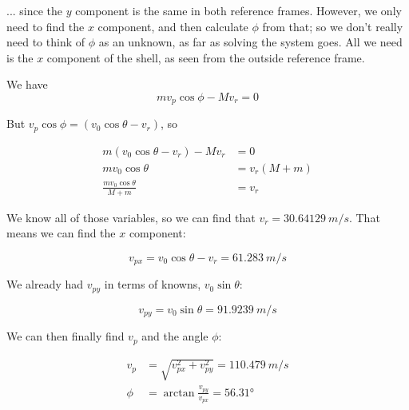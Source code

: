 \documentclass[8.01x]{subfiles}
\begin{document}
... since the $y$ component is the same in both reference frames. However, we only need to find the $x$ component, and then calculate $\phi$ from that; so we don't really need to think of $\phi$ as an unknown, as far as solving the system goes. All we need is the $x$ component of the shell, as seen from the outside reference frame.

We have
\begin{equation}
m v_p \cos \phi - M v_r = 0
\end{equation}

But $v_p \cos \phi = (v_0 \cos \theta - v_r)$, so

\begin{align}
m (v_0 \cos \theta - v_r) - M v_r &= 0\\
m v_0 \cos \theta &= v_r(M + m)\\
\frac{m v_0 \cos \theta}{M + m} &= v_r
\end{align}

We know all of those variables, so we can find that $v_r = \SI{30.64129}{m/s}$. That means we can find the $x$ component:

\begin{equation}
v_{px} = v_0 \cos \theta - v_r = \SI{61.283}{m/s}
\end{equation}

We already had $v_{py}$ in terms of knowns, $v_0 \sin \theta$:

\begin{equation}
v_{py} = v_0 \sin \theta = \SI{91.9239}{m/s}
\end{equation}

We can then finally find $v_p$ and the angle $\phi$:

\begin{align}
v_p  &= \sqrt{v_{px}^2 + v_{py}^2} = \SI{110.479}{m/s}\\
\phi &= \arctan \frac{v_{py}}{v_{px}} = \ang{56.31}
\end{align}
\end{document}
